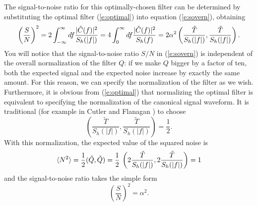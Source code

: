 The signal-to-noise ratio for this optimally-chosen filter can be
determined by substituting the optimal filter (\ref{e:optimal}) into
equation (\ref{e:sovern}), obtaining
\begin{equation}
\nonumber
\left( {S \over N} \right)^2 = 
 2 \int_{-\infty}^\infty df {| \tilde C(f) |^2 \over S_h(|f|)} =
 4 \int_{0}^\infty df { | \tilde C(f) |^2 \over S_h(f)} = 2 \alpha^2 
 \left(\frac{\tilde{T}}{S_h(|f|)},\frac{\tilde{T}}{S_h(|f|)}\right).
\end{equation}
You will notice that the signal-to-noise ratio $S/N$ in
(\ref{e:sovern}) is independent of the overall normalization of the
filter $Q$:  if we make $Q$ bigger by a factor of ten, both the
expected signal and the expected noise increase by exactly the same
amount.  For this reason, we can specify the normalization of the 
filter as we wish. Furthermore, it is obvious from (\ref{e:optimal}) 
that normalizing the optimal filter is equivalent to specifying the
normalization of the canonical signal waveform. It is traditional
(for example in Cutler and Flanagan \cite{cutler:1994})
to choose 
\begin{equation}
\label{e:cfnorm}
   \left(\frac{\tilde{T}}{S_h(|f|)},\frac{\tilde{T}}{S_h(|f|)}
   \right)=\frac{1}{2}.
\end{equation}
With this normalization, 
the expected value of the squared noise is
\begin{equation}
\langle N^2 \rangle = {1 \over 2} (\tilde Q,\tilde Q) = {1 \over 2} \>
\left( 2 \frac{\tilde{T}}{S_h(|f|)},2 \frac{\tilde{T}}{S_h(|f|)}
   \right) = 1
\end{equation}
and the signal-to-noise ratio takes the simple form
\begin{equation}
\left(\frac{S}{N}\right)^2 = \alpha^2.
\end{equation}

\newpage
\newpage
\newpage
\newpage
\newpage
